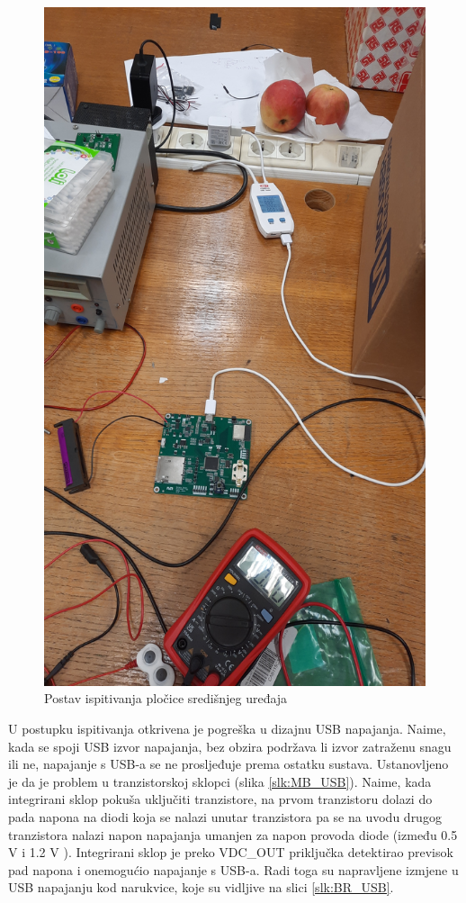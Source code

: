 \begin{figure}[htb]
    \centering
    \includegraphics[width=10 cm]{Figures/MB_TEST_02.jpg}
    \caption{Postav ispitivanja pločice središnjeg uređaja}
    \label{slk:MB_TEST_02}
\end{figure}

U postupku ispitivanja otkrivena je pogreška u dizajnu USB napajanja. Naime, kada se spoji USB izvor napajanja, bez obzira podržava li izvor zatraženu snagu ili ne, napajanje s USB-a se ne prosljeđuje prema ostatku sustava. Ustanovljeno je da je problem u tranzistorskoj sklopci (slika \ref{slk:MB_USB}). Naime, kada integrirani sklop pokuša uključiti tranzistore, na prvom tranzistoru dolazi do pada napona na diodi koja se nalazi unutar tranzistora pa se na uvodu drugog tranzistora nalazi napon napajanja umanjen za napon provoda diode (između 0.5 V i 1.2 V \cite{di:dmp3098}). Integrirani sklop je preko VDC\_OUT priključka detektirao previsok pad napona i onemogućio napajanje s USB-a. Radi toga su napravljene izmjene u USB napajanju kod narukvice, koje su vidljive na slici \ref{slk:BR_USB}.

